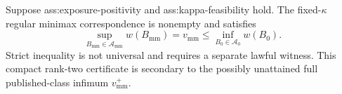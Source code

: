 Suppose ass:exposure-positivity and ass:kappa-feasibility hold.  The fixed-\(\kappa\) regular minimax correspondence is nonempty and satisfies
\[
\sup_{B_{\mathrm{mm}}\in\mathcal A_{\mathrm{mm}}}w(B_{\mathrm{mm}})
=v_{\mathrm{mm}}
\le
\inf_{B_0\in\mathcal A_0}w(B_0).
\]
Strict inequality is not universal and requires a separate lawful witness.  This compact rank-two certificate is secondary to the possibly unattained full published-class infimum \(v_{\mathrm{mm}}^+\).